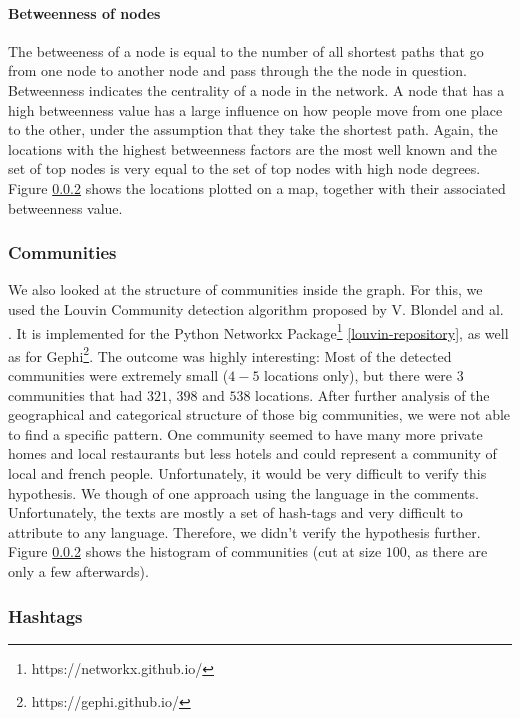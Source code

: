 \paragraph{Betweenness of nodes}
The betweeness of a node is equal to the number of all shortest paths that go from one node to another node and pass through the the node in question. Betweenness indicates the centrality of a node in the network. A node that has a high betweenness value has a large influence on how people move from one place to the other, under the assumption that they take the shortest path. Again, the locations with the highest betweenness factors are the most well known and the set of top nodes is very equal to the set of top nodes with high node degrees. Figure \ref{} shows the locations plotted on a map, together with their associated betweenness value.

\subsubsection{Communities}

We also looked at the structure of communities inside the graph. For this, we used the Louvin Community detection algorithm proposed by V. Blondel and al. \cite{blondel2008fast}. It is implemented for the Python Networkx Package\footnote{{https://networkx.github.io/}} \ref{louvin-repository}, as well as for Gephi\footnote{https://gephi.github.io/}. The outcome was highly interesting: Most of the detected communities were extremely small ($4-5$ locations only), but there were 3 communities that had $321$, $398$ and $538$ locations. After further analysis of the geographical and categorical structure of those big communities, we were not able to find a specific pattern. One community seemed to have many more private homes and local restaurants but less hotels and could represent a community of local and french people. Unfortunately, it would be very difficult to verify this hypothesis. We though of one approach using the language in the comments. Unfortunately, the texts are mostly a set of hash-tags and very difficult to attribute to any language. Therefore, we didn't verify the hypothesis further. Figure \ref{} shows the histogram of communities (cut at size $100$, as there are only a few afterwards).

\subsubsection{Hashtags}

